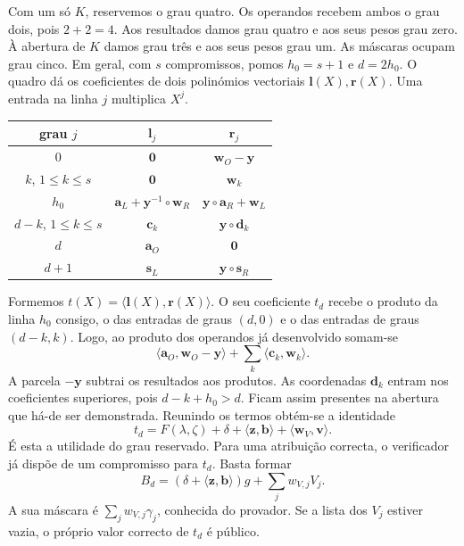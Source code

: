 Com um só \(K\), reservemos o grau quatro. Os operandos recebem ambos
o grau dois, pois \(2+2=4\). Aos resultados damos grau quatro e aos
seus pesos grau zero. À abertura de \(K\) damos grau três e aos seus
pesos grau um. As máscaras ocupam grau cinco. Em geral, com \(s\)
compromissos, pomos \(h_0=s+1\) e \(d=2h_0\).
O quadro dá os coeficientes de dois polinómios vectoriais
\(\boldsymbol l(X),\boldsymbol r(X)\). Uma entrada na linha \(j\)
multiplica \(X^j\).
\begin{center}
\begin{tabular}{c|c|c}
 grau \(j\) & \(\boldsymbol l_j\) & \(\boldsymbol r_j\)\\
 \hline
 \(0\) & \(\boldsymbol0\) & \(\boldsymbol w_O-\boldsymbol y\)\\
 \(k\), \(1\leq k\leq s\) & \(\boldsymbol0\) & \(\boldsymbol w_k\)\\
 \(h_0\) & \(\boldsymbol a_L+\boldsymbol y^{-1}\circ\boldsymbol w_R\)
           & \(\boldsymbol y\circ\boldsymbol a_R+\boldsymbol w_L\)\\
 \(d-k\), \(1\leq k\leq s\) & \(\boldsymbol c_k\)
           & \(\boldsymbol y\circ\boldsymbol d_k\)\\
 \(d\) & \(\boldsymbol a_O\) & \(\boldsymbol0\)\\
 \(d+1\) & \(\boldsymbol s_L\) & \(\boldsymbol y\circ\boldsymbol s_R\)
\end{tabular}
\end{center}
Formemos \(t(X)=\langle\boldsymbol l(X),\boldsymbol r(X)\rangle\).
O seu coeficiente \(t_d\) recebe o produto da linha \(h_0\) consigo,
o das entradas de graus \((d,0)\) e o das entradas de graus \((d-k,k)\).
Logo, ao produto dos operandos já desenvolvido somam-se
\[
 \langle\boldsymbol a_O,\boldsymbol w_O-\boldsymbol y\rangle
   +\sum_k\langle\boldsymbol c_k,\boldsymbol w_k\rangle .
\]
A parcela \(-\boldsymbol y\) subtrai os resultados aos produtos. As
coordenadas \(\boldsymbol d_k\) entram nos coeficientes superiores,
pois \(d-k+h_0>d\). Ficam assim presentes na abertura que há-de ser
demonstrada. Reunindo os termos obtém-se a identidade
\begin{equation}
 t_d=F(\lambda,\zeta)+\delta+\langle\boldsymbol z,\boldsymbol b\rangle
                           +\langle\boldsymbol w_V,\boldsymbol v\rangle .
 \label{eq:gbp-coeficiente}
\end{equation}
É esta a utilidade do grau reservado. Para uma atribuição correcta,
o verificador já dispõe de um compromisso para \(t_d\). Basta formar
\begin{equation}
 B_d=(\delta+\langle\boldsymbol z,\boldsymbol b\rangle)g+
                         \sum_j w_{V,j} V_j .
 \label{eq:gbp-coef-publico}
\end{equation}
A sua máscara é \(\sum_j w_{V,j}\gamma_j\), conhecida do provador.
Se a lista dos \(V_j\) estiver vazia, o próprio valor correcto de
\(t_d\) é público.

